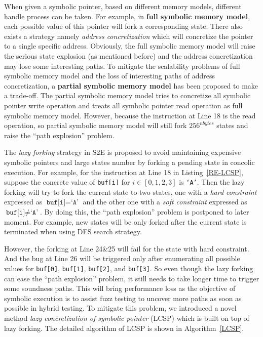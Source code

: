 When given a symbolic pointer, based on different memory models, different handle process can be taken. For example, in \textbf{full symbolic memory model}, each possible value of this pointer will fork a corresponding state. There also exists a strategy namely \textit{address concretization} which will concretize the pointer to a single specific address. Obviously, the full symbolic memory model will raise the serious state explosion (as mentioned before) and the address concretization may lose some interesting paths. To mitigate the scalability problems of full symbolic memory model and the loss of interesting paths of address concretization, a \textbf{partial symbolic memory model} has been proposed to make a trade-off. The partial symbolic memory model tries to concretize all symbolic pointer write operation and treats all symbolic pointer read operation as full symbolic memory model. However, because the instruction at Line 18 is the read operation, so partial symbolic memory model will still fork $256^{nbytes}$ states and raise the ``path explosion'' problem.

The \textit{lazy forking} strategy in S2E is proposed to avoid maintaining expensive symbolic pointers and large states number by forking a pending state in concolic execution. 
For example, for the instruction at Line 18 in Listing~\ref{RE-LCSP}, suppose the concrete value of \texttt{buf[i]} for $i\in[0,1,2,3]$ is \texttt{`A'}. 
Then the lazy forking will try to fork the current state to two states, one with a \textit{hard constraint} expressed as $\texttt{buf[i]}=\texttt{`A'}$ and the other one with a \textit{soft constraint} expressed as $\texttt{buf[i]}\neq\texttt{`A'}$.
By doing this, the ``path explosion'' problem is postponed to later moment. For example, new states will be only forked after the current state is terminated when using DFS search strategy.
 

However, the forking at Line 24\&25 will fail for the state with hard constraint. And the bug at Line 26 will be triggered only after enumerating all possible values for \texttt{buf[0]}, \texttt{buf[1]}, \texttt{buf[2]}, and \texttt{buf[3]}. So even though the lazy forking can ease the ``path explosion'' problem, it still needs to take longer time to trigger some soundness paths. This will bring performance loss as the objective of symbolic execution is to assist fuzz testing to uncover more paths as soon as possible in hybrid testing. 
To mitigate this problem, we introduced a novel method \emph{lazy concretization of symbolic pointer} (LCSP) which is built on top of lazy forking. The detailed algorithm of LCSP is shown in Algorithm~\ref{LCSP}.

